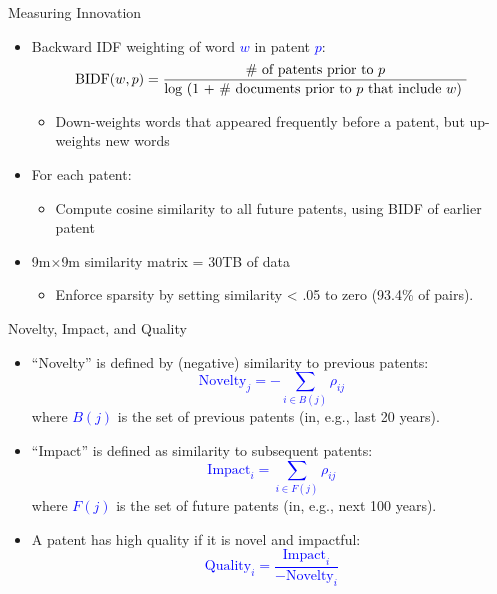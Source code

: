 \documentclass[english]{beamer}
\begin{document}
\begin{frame}{Measuring Innovation}
\begin{itemize}
\setlength{\itemsep}{1em}

\item Backward IDF weighting of word \textcolor{blue}{$w$} in patent \textcolor{blue}{$p$}:
\textcolor{blue}{\[
\text{BIDF}(w,p)=\frac{\text{\# of patents prior to \ensuremath{p}}}{\text{log (1 + \# documents prior to \ensuremath{p} that include \ensuremath{w}) }}
\]}

\begin{itemize}
\item Down-weights words that appeared frequently before a patent, but up-weights
new words
\end{itemize}

\pause{}

\item For each patent:
\vspace{5pt}

\begin{itemize}
\item Compute cosine similarity to all future patents, using BIDF of earlier patent

\pause{}
\end{itemize}
\item 9m$\times$9m similarity matrix = 30TB of data
\vspace{5pt}
\begin{itemize}
\item Enforce sparsity by setting similarity < .05 to zero (93.4\% of pairs).
\end{itemize}
\end{itemize}
\end{frame}

\begin{frame}{Novelty, Impact, and Quality}
\begin{itemize}
\item ``Novelty'' is defined by (negative) similarity to previous patents:
\textcolor{blue}{\[
\text{Novelty}_{j}=-\sum_{i\in B(j)}\rho_{ij}
\]}
where \textcolor{blue}{$B(j)$} is the set of previous patents (in, e.g., last 20 years).

\pause{}

\vspace{5pt}

\item ``Impact'' is defined as similarity to subsequent patents:
\textcolor{blue}{\[
\text{Impact}_{i}=\sum_{i\in F(j)}\rho_{ij}
\]}
where \textcolor{blue}{$F(j)$} is the set of future patents (in, e.g., next 100 years).

\pause{}

\vspace{5pt}

\item A patent has high quality if it is novel and impactful:
\textcolor{blue}{\[
\text{Quality}_{i}=\frac{\text{Impact}_{i}}{-\text{Novelty}_{i}}
\]}
\end{itemize}
\end{frame}
\end{document}
